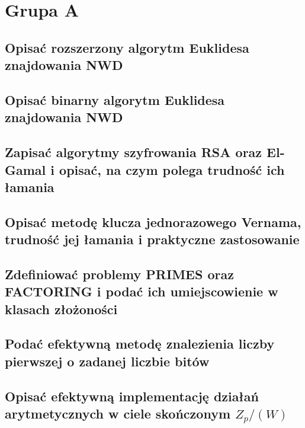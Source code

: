 \section{Grupa A}

\subsection{Opisać rozszerzony algorytm Euklidesa znajdowania NWD}


\subsection{Opisać binarny algorytm Euklidesa znajdowania NWD}



\subsection{Zapisać algorytmy szyfrowania RSA oraz El-Gamal i opisać, na czym polega trudność ich łamania}


\subsection{Opisać metodę klucza jednorazowego Vernama, trudność jej łamania i praktyczne zastosowanie}


\subsection{Zdefiniować problemy PRIMES oraz FACTORING i podać ich umiejscowienie w klasach złożoności}



\subsection{Podać efektywną metodę znalezienia liczby pierwszej o zadanej liczbie bitów}



\subsection{Opisać efektywną implementację działań arytmetycznych w ciele skończonym $Z_p/(W)$}



